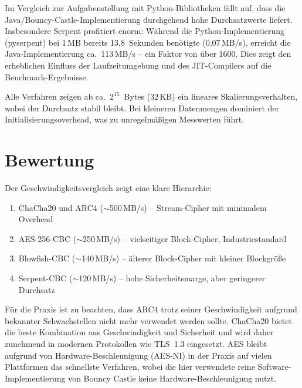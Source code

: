 \documentclass[
    fontsize=12pt,          %
    paper=a4,               %
    numbers=noenddot,       %
    listof=totoc,           %
    listof=entryprefix,     %
    listof=nochaptergap,    %
    bibliography=totoc,     %
    parskip=half,           %
    openany                 %
]{scrbook}
\begin{document}
Im Vergleich zur Aufgabenstellung mit Python-Bibliotheken fällt auf, dass die Java/Bouncy-Castle-Implementierung durchgehend hohe Durchsatzwerte liefert.
Insbesondere Serpent profitiert enorm: Während die Python-Implementierung (pyserpent) bei 1\,MB bereits 13{,}8~Sekunden benötigte (0{,}07\,MB/s), erreicht die Java-Implementierung ca.\ 113\,MB/s -- ein Faktor von über 1600.
Dies zeigt den erheblichen Einfluss der Laufzeitumgebung und des JIT-Compilers auf die Benchmark-Ergebnisse.

Alle Verfahren zeigen ab ca.\ $2^{15}$~Bytes (32\,KB) ein lineares Skalierungsverhalten, wobei der Durchsatz stabil bleibt.
Bei kleineren Datenmengen dominiert der Initialisierungsoverhead, was zu unregelmäßigen Messwerten führt.


\section*{Bewertung}

Der Geschwindigkeitsvergleich zeigt eine klare Hierarchie:
\begin{enumerate}
    \item ChaCha20 und ARC4 ($\sim$500\,MB/s) -- Stream-Cipher mit minimalem Overhead
    \item AES-256-CBC ($\sim$250\,MB/s) -- vielseitiger Block-Cipher, Industriestandard
    \item Blowfish-CBC ($\sim$140\,MB/s) -- älterer Block-Cipher mit kleiner Blockgröße
    \item Serpent-CBC ($\sim$120\,MB/s) -- hohe Sicherheitsmarge, aber geringerer Durchsatz
\end{enumerate}

Für die Praxis ist zu beachten, dass ARC4 trotz seiner Geschwindigkeit aufgrund bekannter Schwachstellen nicht mehr verwendet werden sollte.
ChaCha20 bietet die beste Kombination aus Geschwindigkeit und Sicherheit und wird daher zunehmend in modernen Protokollen wie TLS~1.3 eingesetzt.
AES bleibt aufgrund von Hardware-Beschleunigung (AES-NI) in der Praxis auf vielen Plattformen das schnellste Verfahren, wobei die hier verwendete reine Software-Implementierung von Bouncy Castle keine Hardware-Beschleunigung nutzt.

\end{document}
